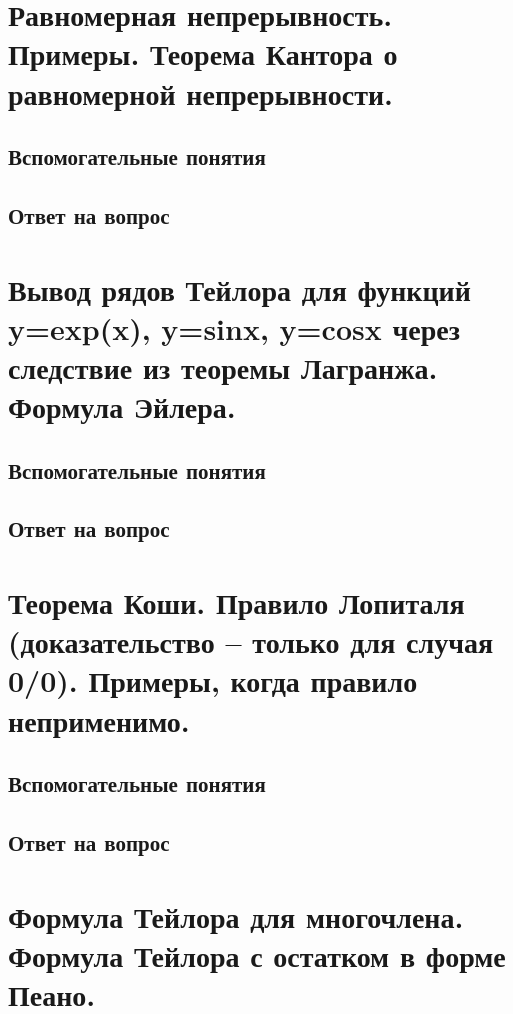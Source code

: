\documentclass[12pt,a4paper]{article}
\begin{document}
\newpage
\section{Равномерная непрерывность. Примеры. Теорема Кантора о равномерной непрерывности.}

\subsection*{Вспомогательные понятия}


\subsection*{Ответ на вопрос}


\newpage
\section{Вывод рядов Тейлора для функций y=exp(x), y=sinx, y=cosx через следствие из теоремы Лагранжа. Формула Эйлера.}

\subsection*{Вспомогательные понятия}


\subsection*{Ответ на вопрос}


\newpage
\section{Теорема Коши. Правило Лопиталя (доказательство – только для случая 0/0). Примеры, когда правило неприменимо.}

\subsection*{Вспомогательные понятия}


\subsection*{Ответ на вопрос}


\newpage
\section{Формула Тейлора для многочлена. Формула Тейлора с остатком в форме Пеано.}
\end{document}
